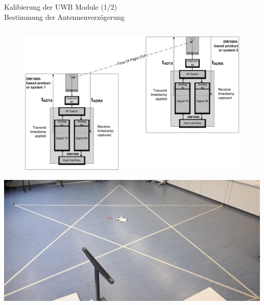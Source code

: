 \documentclass{beamer}
\begin{document}
\begin{frame}{Kalibierung der UWB Module (1/2)\\\normalsize{Bestimmung der Antennenverzögerung}}
	\begin{columns}
		\begin{column}{0.5\linewidth}
			\centering


			\begin{overlayarea}{\linewidth}{.4\textheight}
				\only<1>
				{
					\begin{figure}
						\includegraphics[width=\linewidth]{decawave2014calibration_fig1}
						\caption{\cite{decawave2014calibration}}
					\end{figure}
				}
				{
					\includegraphics[width=\linewidth]{calibration_pentagram2}
				}
			\end{overlayarea}
		\end{column}

\end{columns}
\end{frame}
\end{document}

